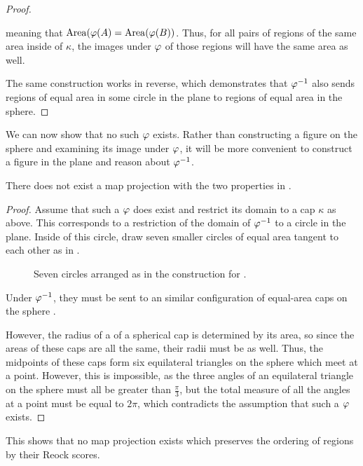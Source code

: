 \begin{proof}
{  }

  meaning that $\mathrm{Area}(\varphi(A) = \mathrm{Area}(\varphi(B))$. 
  Thus, for all pairs of regions of the same area inside of $\kappa$,
  the images under $\varphi$ of those regions will have the same area as
  well.

  The same construction works in reverse, which demonstrates that
  $\varphi^{-1}$ also sends regions of equal area in some circle in the
  plane to regions of  equal area in the sphere.
\end{proof} 

We can now show that no such $\varphi$ exists.  Rather than constructing a figure on the sphere and examining its image under $\varphi$, it will be more convenient to construct a figure in the plane and reason about $\varphi^{-1}$.

\begin{theorem}\label{thm:reockbad}
  There does not exist a map projection with the two properties in
  .  
\end{theorem}
\begin{proof}

  Assume that such a $\varphi$ does exist and restrict its domain to
  a cap $\kappa$ as above.  This corresponds to a restriction of the
  domain of $\varphi^{-1}$ to a circle in the plane.  Inside of this
  circle, draw seven smaller circles of equal area tangent to each
  other as in .

  \begin{figure}[!htb]
    
    \centering
    
    \caption{Seven circles arranged as in the construction for .}
    \label{fig:sevencircles}
  \end{figure}	

  Under $\varphi^{-1}$, they must be sent to an similar configuration 
  of equal-area caps on the sphere .  

  However, the radius of a
  of a spherical cap is determined by its area, so since the areas of
  these caps are all the same, their radii must be as well. Thus, 
  the midpoints of these caps form six equilateral triangles on the sphere
  which meet at a point.  However, this is impossible, as the three 
  angles of an equilateral triangle on the sphere must all be greater
  than $\tfrac{\pi}{3}$, but the total measure of all the angles at
  a point must be equal to
  $2\pi$, which contradicts the assumption that such a $\varphi$ exists.
\end{proof}

This shows that no map projection exists which preserves the ordering of regions by their Reock scores.
